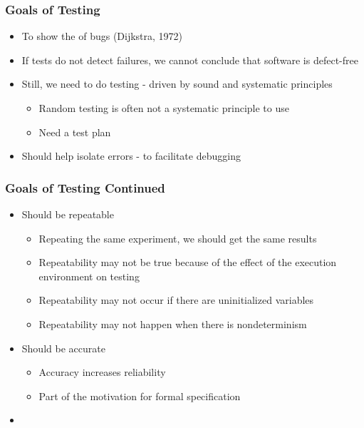 \documentclass[t,12pt,numbers,fleqn]{beamer}
\begin{document}
\begin{frame}
\frametitle{Goals of Testing}

\begin{itemize}

\item To show the  of bugs (Dijkstra, 1972)
\item If tests do not detect failures, we cannot conclude that software is defect-free
\item Still, we need to do testing - driven by sound and systematic principles
\begin{itemize}
\item Random testing is often not a systematic principle to use
\item Need a test plan
\end{itemize}
\item Should help isolate errors - to facilitate debugging

\end{itemize}

\end{frame}


\begin{frame}
\frametitle{Goals of Testing Continued}

\begin{itemize}
\item Should be repeatable
\begin{itemize}
\item Repeating the same experiment, we should get the same results
\item Repeatability may not be true because of the effect of the execution
  environment on testing
\item Repeatability may not occur if there are uninitialized variables
\item Repeatability may not happen when there is nondeterminism
\end{itemize}

\item Should be accurate
\begin{itemize}
\item Accuracy increases reliability
\item Part of the motivation for formal specification
\end{itemize}

\item {}

\end{itemize}

\end{frame}
\end{document}
